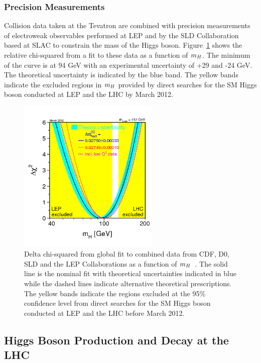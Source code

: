 \subsubsection{Precision Measurements}
Collision data taken at the Tevatron are combined with precision measurements 
of electroweak observables performed at LEP
and by the SLD Collaboration based at SLAC to constrain the mass of the 
Higgs boson. Figure~\ref{fig:blueband} shows the relative chi-squared from a fit
to these data as a function of $m_{H}$. The minimum of the curve is at 94 GeV
with an experimental uncertainty of +29 and -24 GeV. The theoretical uncertainty
is indicated by the blue band. The yellow bands indicate the excluded regions in 
$m_{H}$ provided by direct searches for the SM Higgs boson conducted at LEP
and the LHC by March 2012.
\begin{figure}
\begin{center}
\includegraphics[width=0.6\textwidth]{theory/pheno/w12_blueband.jpg}
\caption{Delta chi-squared from global fit to combined data from CDF, D0, SLD and the LEP
Collaborations as a function of $m_{H}$~\cite{lepewwgpage}. 
The solid line is the nominal fit with theoretical
uncertainties indicated in blue while the dashed lines indicate alternative theoretical 
prescriptions. The yellow bands indicate the regions excluded at the 95\% confidence level
from direct searches for the SM Higgs boson conducted at LEP and the LHC before March 2012.} 
\label{fig:blueband}
\end{center}
\end{figure}

\subsection{Higgs Boson Production and Decay at the LHC}

